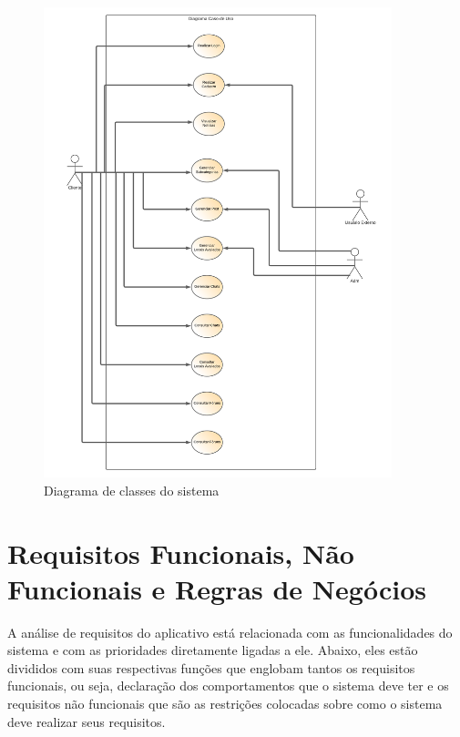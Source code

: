 \begin{figure}[htb]
	\centering
	\caption{\label{fig_arq_virado}Diagrama de classes do sistema}
	\includegraphics[width=0.90\textwidth]{anexos/Diagrama_em_branco.png}
	
\end{figure}


\section{Requisitos Funcionais, Não Funcionais e Regras de Negócios}



A análise de requisitos do aplicativo está relacionada com as funcionalidades do sistema e com as prioridades diretamente ligadas a ele. Abaixo, eles estão divididos com suas respectivas funções que englobam tantos os requisitos funcionais, ou seja, declaração dos comportamentos que o sistema deve ter e os requisitos não funcionais que são as restrições colocadas sobre como o sistema deve realizar seus requisitos.

